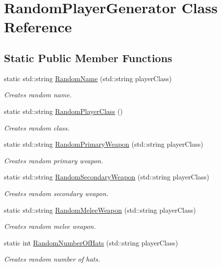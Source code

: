 \hypertarget{class_random_player_generator}{}\section{Random\+Player\+Generator Class Reference}
\label{class_random_player_generator}
\subsection*{Static Public Member Functions}
\begin{DoxyCompactItemize}
\item 
static std\+::string \hyperlink{class_random_player_generator_a77f060ac6cb51407e932c2a3f4fd31b2}{Random\+Name} (std\+::string player\+Class)
\begin{DoxyCompactList}\small\item\em Creates random name. \end{DoxyCompactList}\item 
static std\+::string \hyperlink{class_random_player_generator_a6ef76bd38b842493a68587af8ac5e2ca}{Random\+Player\+Class} ()
\begin{DoxyCompactList}\small\item\em Creates random class. \end{DoxyCompactList}\item 
static std\+::string \hyperlink{class_random_player_generator_a5eaeae37f585247907a1a488112023ff}{Random\+Primary\+Weapon} (std\+::string player\+Class)
\begin{DoxyCompactList}\small\item\em Creates random primary weapon. \end{DoxyCompactList}\item 
static std\+::string \hyperlink{class_random_player_generator_aa87813d47db6d9f7aade0d20646bebe4}{Random\+Secondary\+Weapon} (std\+::string player\+Class)
\begin{DoxyCompactList}\small\item\em Creates random secondary weapon. \end{DoxyCompactList}\item 
static std\+::string \hyperlink{class_random_player_generator_a07240f9eab0983fd9ced58ba19d4af39}{Random\+Melee\+Weapon} (std\+::string player\+Class)
\begin{DoxyCompactList}\small\item\em Creates random melee weapon. \end{DoxyCompactList}\item 
static int \hyperlink{class_random_player_generator_ae5c2055098cfb2b74374bd180b60d003}{Random\+Number\+Of\+Hats} (std\+::string player\+Class)
\begin{DoxyCompactList}\small\item\em Creates random number of hats. \end{DoxyCompactList}\end{DoxyCompactItemize}
